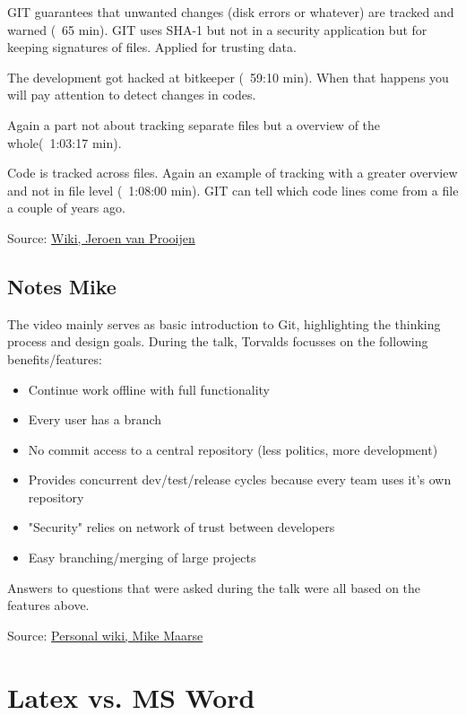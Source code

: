 GIT guarantees that unwanted changes (disk errors or whatever) are tracked and warned 
(~65 min). GIT uses SHA-1 but not in a security application but for keeping signatures of 
files. Applied for trusting data.

The development got hacked at bitkeeper (~59:10 min). When that happens you will pay 
attention to detect changes in codes.

Again a part not about tracking separate files but a overview of the whole(~1:03:17 min).

Code is tracked across files. Again an example of tracking with a greater overview and not 
in file level (~1:08:00 min). GIT can tell which code lines come from a file a couple of 
years ago.

\vspace{2mm}

Source: \href{https://www.os3.nl/2015-2016/students/jeroen_van_prooijen/es/week39#youtube}{Wiki, Jeroen van Prooijen}

\section{Notes Mike}
The video mainly serves as basic introduction to Git, highlighting the thinking process and design goals. During the talk, Torvalds focusses on the following benefits/features:

\begin{itemize}
\item Continue work offline with full functionality
\item Every user has a branch
\item No commit access to a central repository (less politics, more development)
\item Provides concurrent dev/test/release cycles because every team uses it's own repository
\item"Security" relies on network of trust between developers
\item Easy branching/merging of large projects
\end{itemize}

Answers to questions that were asked during the talk were all based on the features above.

\vspace{2mm}

Source: \href{https://www.os3.nl/2015-2016/students/mike_maarse/es/es_ga_wk39_2}{Personal wiki, Mike Maarse}

\chapter{Latex vs. MS Word}

